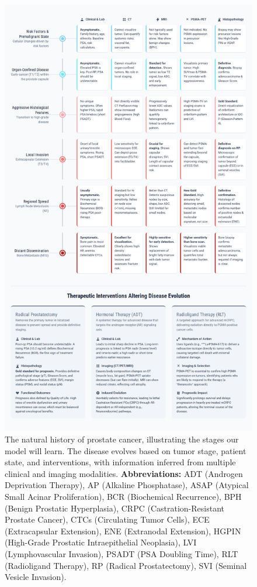 \documentclass[11pt, a4paper]{article}
\begin{document}
\begin{figure}[H]
    \centering
    \includegraphics[width=\textwidth]{pe.png}
    \caption{The natural history of prostate cancer, illustrating the stages our model will learn. The disease evolves based on tumor stage, patient state, and interventions, with information inferred from multiple clinical and imaging modalities. \textbf{Abbreviations:} ADT (Androgen Deprivation Therapy), AP (Alkaline Phosphatase), ASAP (Atypical Small Acinar Proliferation), BCR (Biochemical Recurrence), BPH (Benign Prostatic Hyperplasia), CRPC (Castration-Resistant Prostate Cancer), CTCs (Circulating Tumor Cells), ECE (Extracapsular Extension), ENE (Extranodal Extension), HGPIN (High-Grade Prostatic Intraepithelial Neoplasia), LVI (Lymphovascular Invasion), PSADT (PSA Doubling Time), RLT (Radioligand Therapy), RP (Radical Prostatectomy), SVI (Seminal Vesicle Invasion).}
    \label{fig:prostate_evolution}
\end{figure}
\end{document}
